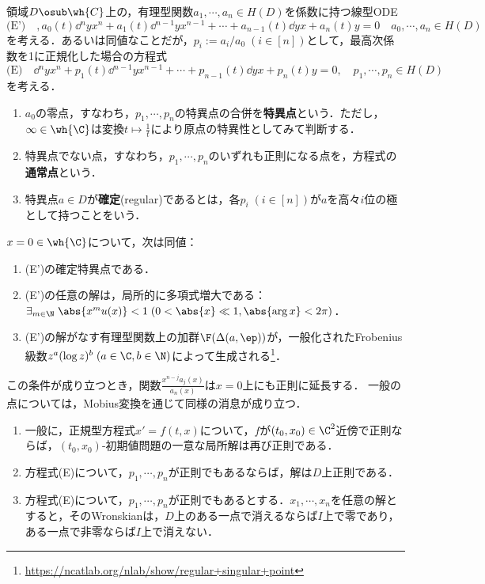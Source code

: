 \documentclass[uplatex,dvipdfmx]{jsreport}
\begin{document}
\begin{problem}[有理型関数係数の常微分方程式]
    領域$D\osub\wh{C}$上の，有理型関数$a_1,\cdots,a_n\in H(D)$を係数に持つ線型ODE
    \[\text{(E')} \quad ,a_0(t)\dd{^ny}{x^n}+a_1(t)\dd{^{n-1}y}{x^{n-1}}+\cdots+a_{n-1}(t)\dd{y}{x}+a_n(t)y=0\quad a_0,\cdots,a_n\in H(D)\]
    を考える．あるいは同値なことだが，$p_i:=a_i/a_0\;(i\in[n])$として，最高次係数を1に正規化した場合の方程式
    \[\text{(E)} \quad \dd{^ny}{x^n}+p_1(t)\dd{^{n-1}y}{x^{n-1}}+\cdots+p_{n-1}(t)\dd{y}{x}+p_n(t)y=0,\quad p_1,\cdots,p_n\in H(D)\]
    を考える．
    \begin{enumerate}
        \item $a_0$の零点，すなわち，$p_1,\cdots,p_n$の特異点の合併を\textbf{特異点}という．ただし，$\infty\in\wh{\C}$は変換$t\mapsto\frac{1}{t}$により原点の特異性としてみて判断する．
        \item 特異点でない点，すなわち，$p_1,\cdots,p_n$のいずれも正則になる点を，方程式の\textbf{通常点}という．
        \item 特異点$a\in D$が\textbf{確定}(regular)であるとは，各$p_i\;(i\in[n])$が$a$を高々$i$位の極として持つことをいう．
    \end{enumerate}
\end{problem}

\begin{proposition}
    $x=0\in\wh{\C}$について，次は同値：
    \begin{enumerate}
        \item (E')の確定特異点である．
        \item (E')の任意の解は，局所的に多項式増大である：$\exists_{m\in\N}\;\abs{x^mu(x)}<1\;(0<\abs{x}\ll1,\abs{\arg x}<2\pi)$．
        \item (E')の解がなす有理型関数上の加群$\F(\Delta(a,\ep))$が，一般化されたFrobenius級数$z^a(\log z)^b\;(a\in\C,b\in\N)$によって生成される\footnote{\url{https://ncatlab.org/nlab/show/regular+singular+point}}．
    \end{enumerate}
    この条件が成り立つとき，関数$\frac{x^{n-j}a_j(x)}{a_n(x)}$は$x=0$上にも正則に延長する．
    一般の点については，Mobius変換を通じて同様の消息が成り立つ．
\end{proposition}

\begin{theorem}[係数が正則である場合]\mbox{}
    \begin{enumerate}
        \item 一般に，正規型方程式$x'=f(t,x)$について，$f$が$(t_0,x_0)\in\C^2$近傍で正則ならば，$(t_0,x_0)$-初期値問題の一意な局所解は再び正則である．
        \item 方程式(E)について，$p_1,\cdots,p_n$が正則でもあるならば，解は$D$上正則である．
        \item 方程式(E)について，$p_1,\cdots,p_n$が正則でもあるとする．$x_1,\cdots,x_n$を任意の解とすると，そのWronskianは，$D$上のある一点で消えるならば$I$上で零であり，ある一点で非零ならば$I$上で消えない．
    \end{enumerate}
\end{theorem}
\end{document}
